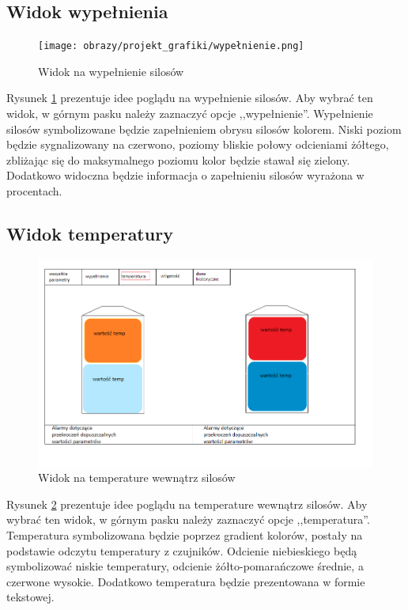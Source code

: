     \subsection{Widok wypełnienia}
        \begin{figure}[H]
            \centering
            \texttt{[image: obrazy/projekt\_grafiki/wypełnienie.png]}
            \caption{Widok na wypełnienie silosów}
            \label{fig: wypelnienie}
        \end{figure}

        Rysunek \ref{fig: wypelnienie} prezentuje idee poglądu na wypełnienie silosów. Aby wybrać ten widok,
        w górnym pasku należy zaznaczyć opcje ,,wypełnienie''. Wypełnienie silosów symbolizowane będzie zapełnieniem
        obrysu silosów kolorem. Niski poziom będzie sygnalizowany na czerwono, poziomy bliskie połowy odcieniami żółtego,
        zbliżając się do maksymalnego poziomu kolor będzie stawał się zielony. Dodatkowo widoczna będzie informacja 
        o zapełnieniu silosów wyrażona w procentach.
    \subsection{Widok temperatury}
        \begin{figure}[H]
            \centering
            \includegraphics[width = \textwidth]{obrazy/projekt_grafiki/temperatura.png}
            \caption{Widok na temperature wewnątrz silosów}
            \label{fig: temperatura}
        \end{figure}

        Rysunek \ref{fig: temperatura} prezentuje idee poglądu na temperature wewnątrz silosów. Aby wybrać ten widok,
        w górnym pasku należy zaznaczyć opcje ,,temperatura''. Temperatura symbolizowana będzie poprzez gradient kolorów,
        postały na podstawie odczytu temperatury z czujników. Odcienie niebieskiego będą symbolizować niskie temperatury,
        odcienie żółto-pomarańczowe średnie, a czerwone wysokie. Dodatkowo temperatura będzie prezentowana w formie 
        tekstowej.
